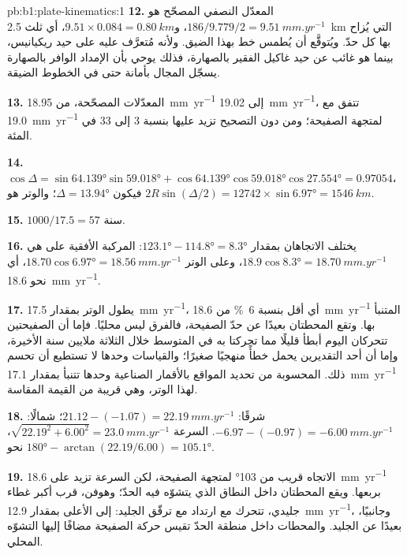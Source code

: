 \begin{solution}{pb:b1:plate-kinematics:1}
\textbf{12.} المعدّل النصفي المصحّح هو $186/9.779/2 = \qty{9.51}{mm.yr^{-1}}$،
و$9.51\times0.084 = \qty{0.80}{km}$، أي ثلث \qty{2.5}{km} التي يُزاح بها كل حدّ. ويُتوقَّع أن يُطمس خط بهذا الضيق. ولأنه مُتعرَّف عليه على حيد ريكيانيس، بينما هو غائب عن حيد غاكيل الفقير بالصهارة، فذلك يوحي بأن الإمداد الوافر بالصهارة يسجّل المجال بأمانة حتى في الخطوط الضيقة.

\textbf{13.} المعدّلات المصحّحة، من \qty{18.95}{mm.yr^{-1}} إلى \qty{19.02}{mm.yr^{-1}}، تتفق مع \qty{19.0}{mm.yr^{-1}} لمتجهة الصفيحة؛ ومن دون التصحيح تزيد عليها بنسبة 3 إلى 33 في المئة.

\textbf{14.} $\cos\Delta = \sin\ang{64.139}\sin\ang{59.018} +
\cos\ang{64.139}\cos\ang{59.018}\cos\ang{27.554} = 0.97054$، فيكون $\Delta =
\ang{13.94}$؛ والوتر هو $2R\sin(\Delta/2) = 12742\times\sin\ang{6.97} =
\qty{1546}{km}$.

\textbf{15.} $1000/17.5 = 57$ سنة.

\textbf{16.} يختلف الاتجاهان بمقدار $\ang{123.1} - \ang{114.8} =
\ang{8.3}$: المركبة الأفقية على  هي
$18.9\cos\ang{8.3} = \qty{18.70}{mm.yr^{-1}}$، وعلى الوتر
$18.70\cos\ang{6.97} = \qty{18.56}{mm.yr^{-1}}$، أي نحو \qty{18.6}{mm.yr^{-1}}.

\textbf{17.} يطول الوتر بمقدار \qty{17.5}{mm.yr^{-1}}، أي أقل بنسبة \qty{6}{\percent} من \qty{18.6}{mm.yr^{-1}} المتنبأ بها. وتقع المحطتان بعيدًا عن حدّ الصفيحة، فالفرق ليس محليًا. فإما أن الصفيحتين تتحركان اليوم أبطأ قليلًا مما تحركتا به في المتوسط خلال الثلاثة ملايين سنة الأخيرة، وإما أن أحد التقديرين يحمل خطأً منهجيًا صغيرًا؛ والقياسات وحدها لا تستطيع أن تحسم ذلك.  المحسوبة من تحديد المواقع بالأقمار الصناعية وحدها تتنبأ بمقدار \qty{17.1}{mm.yr^{-1}} لهذا الوتر، وهي قريبة من القيمة المقاسة.

\textbf{18.} شرقًا: $21.12 - (-1.07) = \qty{22.19}{mm.yr^{-1}}$؛ شمالًا:
$-6.97 - (-0.97) = \qty{-6.00}{mm.yr^{-1}}$. السرعة $\sqrt{22.19^2 + 6.00^2} =
\qty{23.0}{mm.yr^{-1}}$، نحو $\ang{180} - \arctan(22.19/6.00) =
\ang{105.1}$.

\textbf{19.} الاتجاه قريب من \ang{103} لمتجهة الصفيحة، لكن السرعة تزيد على \qty{18.6}{mm.yr^{-1}} بربعها. ويقع المحطتان داخل النطاق الذي يتشوّه فيه الحدّ؛ وهوفن، قرب أكبر غطاء جليدي، تتحرك مع ارتداد  مع ترقّق الجليد: إلى الأعلى بمقدار \qty{12.9}{mm.yr^{-1}}، وجانبيًا، بعيدًا عن الجليد. والمحطات داخل منطقة الحدّ تقيس حركة الصفيحة مضافًا إليها التشوّه المحلي.


\end{solution}
